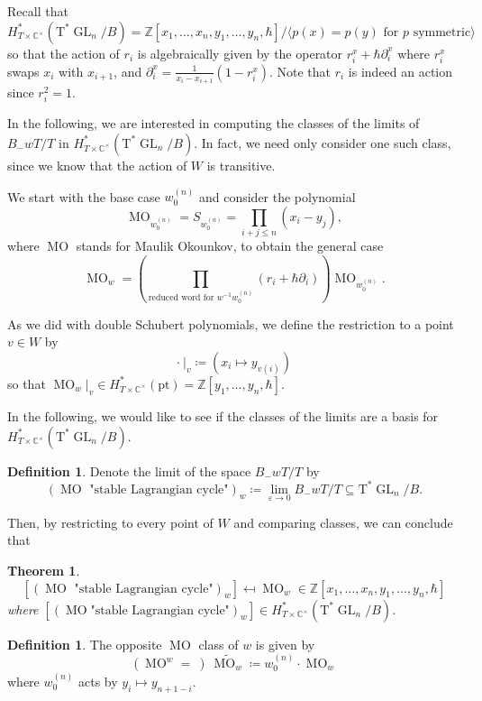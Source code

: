 \documentclass[12pt]{amsart}
\numberwithin{equation}{section}
\newtheorem{Theorem}[equation]{Theorem}
\theoremstyle{definition}
\newtheorem{Definition}[equation]{Definition}
\numberwithin{figure}{section}
\def\la{\langle}
\def\ra{\rangle}
\newcommand{\C}{\mathbb{C}}
\newcommand{\Z}{\mathbb{Z}}
\newcommand{\GL}{\operatorname{GL}}
\newcommand{\MO}{\operatorname{MO}}
\begin{document}
Recall that
\[
	H^*_{T \times \C^\times}(\text{T}^* \GL_n/B) = \Z[x_1, \dots, x_n, y_1, \dots, y_n, \hbar] / \la p(x) = p(y) \text{ for } p \text{ symmetric} \ra
\]
so that the action of $r_i$ is algebraically given by the operator $r_i^x + \hbar \partial_i^x$ where $r_i^x$ swaps $x_i$ with $x_{i+1}$, and  $\partial_i^x = \frac{1}{x_i-x_{i+1}} (1-r_i^x)$. Note that $r_i$ is indeed an action since $r_i^2 = 1$.

In the following, we are interested in computing the classes of the limits of $B_- w T/T$ in $H^*_{T \times \C^\times}(\text{T}^* \GL_n/B)$. In fact, we need only consider one such class, since we know that the action of $W$ is transitive.

We start with the base case $w_0^{(n)}$ and consider the polynomial
\[
	\MO_{w_0^{(n)}} = S_{w_0^{(n)}} = \prod_{i+j\leq n} (x_i-y_j),
\] where $\MO$ stands for Maulik Okounkov, to obtain the general case
\[
	\MO_w = \left(\prod_{\text{reduced word for } w^{-1}w_0^{(n)}} (r_i + \hbar \partial_i)\right) \MO_{w_0^{(n)}}.
\]

As we did with double Schubert polynomials, we define the restriction to a point $v \in W$ by
\[
	\cdot\  |_v \coloneqq (x_i \mapsto y_{v(i)})
\]
so that $\MO_w |_v \in H_{T \times \C^\times}^*(\text{pt}) = \Z[y_1, \dots, y_n, \hbar]$.

In the following, we would like to see if the classes of the limits are a basis for $H^*_{T \times \C^\times}(\text{T}^* \GL_n/B)$.

\begin{Definition}
	Denote the limit of the space $B_-w T/T$ by
	\[
		(\MO \text{ "stable Lagrangian cycle"})_w \coloneqq \lim_{\varepsilon\to 0} B_-w T/T \subseteq \text{T}^* \GL_n/B.
	\]
\end{Definition}

Then, by restricting to every point of $W$ and comparing classes, we can conclude that

\begin{Theorem}
	\[
		[ (\MO \text{ "stable Lagrangian cycle"})_w ]  \mapsfrom \MO_w \in \mathbb{Z}[x_1,\dots,x_n, y_1, \dots, y_n, \hbar]
	\]
	where $[ (\MO \text{"stable Lagrangian cycle"})_w ] \in H^*_{T \times \C^\times}(\text{T}^* \GL_n/B)$.
\end{Theorem}

\begin{Definition}
	The opposite $\MO$ class of $w$ is given by
	\[
		(\MO^w =\ )\  \widetilde{\MO_w} \coloneqq w_0^{(n)} \cdot \MO_w
	\]
	where $w_0^{(n)}$ acts by $y_i \mapsto y_{n+1-i}$.
\end{Definition}
\end{document}
